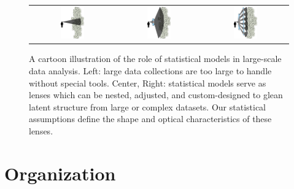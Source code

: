 \begin{figure}
  \center
  \begin{tabular}{ccc}
    \includegraphics[width=0.3\textwidth,height=0.3\textwidth]{chapter_introduction/figures/person_data.pdf} &
    \includegraphics[width=0.3\textwidth,height=0.3\textwidth]{chapter_introduction/figures/person_data_lens.pdf} &
    \includegraphics[width=0.3\textwidth,height=0.3\textwidth]{chapter_introduction/figures/person_data_lens2.pdf} \\
  \end{tabular}
  \caption{A cartoon illustration of the role of statistical models in
    large-scale data analysis.  Left: large data collections are too
    large to handle without special tools. Center, Right: statistical
    models serve as lenses which can be nested, adjusted, and
    custom-designed to glean latent structure from large or complex
    datasets.  Our statistical assumptions define the shape and
    optical characteristics of these lenses.}
  \label{fig:person_data_lens}
\end{figure}


\section*{Organization}


